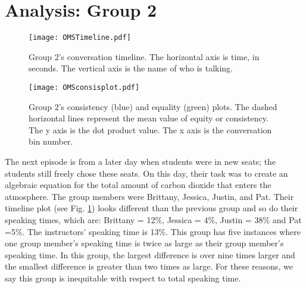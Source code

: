 \documentclass[aps,pra,reprint,noshowpacs,superscriptaddress, nofootinbib]{revtex4-1}
\begin{document}
\section{Analysis: Group 2}
\begin{figure}
\centering
\texttt{[image: OMSTimeline.pdf]}
\caption{Group 2's conversation timeline. The horizontal axis is time, in seconds. The vertical axis is the name of who is talking. \label{fig3}}
\end{figure}

\begin{figure}
\texttt{[image: OMSconsisplot.pdf]}
\caption{Group 2's consistency (blue) and equality (green) plots. The dashed horizontal lines represent the mean value of equity or consistency. The y axis is the dot product value. The x axis is the conversation bin number.\label{fig4}}
\end{figure}

The next episode is from a later day when students were in new seats; the students still freely chose these seats. On this day, their task was to create an algebraic equation for the total amount of carbon dioxide that enters the atmosphere. The group members were Brittany, Jessica, Justin, and Pat. Their timeline plot (see Fig. \ref{fig3}) looks different than the previous group and so do their speaking times, which are: Brittany = 12\%, Jessica = 4\%, Justin = 38\% and Pat =5\%. The instructors' speaking time is 13\%. This group has five instances where one group member's speaking time is twice as large as their group member's speaking time. In this group, the largest difference is over nine times larger and the smallest difference is greater than two times as large. For these reasons, we say this group is inequitable with respect to total speaking time. 
\end{document}
